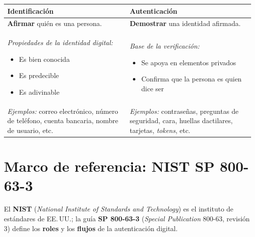\documentclass[11pt,a4paper]{report}
\begin{document}
\begin{center}
\small
{\setlength{\aboverulesep}{0pt}\setlength{\belowrulesep}{0pt}\renewcommand{\arraystretch}{1.3}%
\begin{tabularx}{\linewidth}{>{\raggedright\arraybackslash}X !{\color{gray!45}\vrule width 0.2pt} >{\raggedright\arraybackslash}X}
\toprule
\centering\textbf{Identificación} & \centering\arraybackslash\textbf{Autenticación} \\
\midrule
\textbf{Afirmar} quién es una persona. & \textbf{Demostrar} una identidad afirmada. \\
\midrule
\textit{Propiedades de la identidad digital:}
\vspace{-0.3\baselineskip}\begin{itemize}[leftmargin=*,nosep,topsep=0pt]
  \item Es bien conocida
  \item Es predecible
  \item Es adivinable
\end{itemize}\vspace{2pt}
&
\textit{Base de la verificación:}
\vspace{-0.3\baselineskip}\begin{itemize}[leftmargin=*,nosep,topsep=0pt]
  \item Se apoya en elementos privados
  \item Confirma que la persona es quien dice ser
\end{itemize}\vspace{2pt} \\
\midrule
\textit{Ejemplos:} correo electrónico, número de teléfono, cuenta bancaria, nombre de usuario, etc.
&
\textit{Ejemplos:} contraseñas, preguntas de seguridad, cara, huellas dactilares, tarjetas, \emph{tokens}, etc. \\
\bottomrule
\end{tabularx}}
\end{center}
 
\section{Marco de referencia: NIST SP 800-63-3}
 
El \textbf{NIST} (\emph{National Institute of Standards and Technology}) es el instituto de estándares de EE.\,UU.; la guía \textbf{SP 800-63-3} (\emph{Special Publication} 800-63, revisión 3) define los \textbf{roles} y los \textbf{flujos} de la autenticación digital.
 
\end{document}

